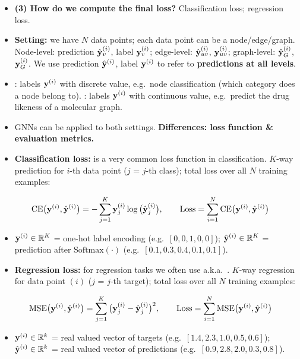\begin{itemize}
  \item \textbf{(3) How do we compute the final loss?} Classification loss;
    regression loss.
  \item \textbf{Setting:} we have $N$ data points; each data point can be a
    node/edge/graph. Node-level: prediction $\hat{\mathbf{y}}_v^{(i)}$, label
    $\mathbf{y}_v^{(i)}$; edge-level: $\hat{\mathbf{y}}_{uv}^{(i)}$, $\mathbf{y}_{uv}^{(i)}$;
    graph-level: $\hat{\mathbf{y}}_G^{(i)}$, $\mathbf{y}_G^{(i)}$. We use prediction
    $\hat{\mathbf{y}}^{(i)}$, label $\mathbf{y}^{(i)}$ to refer to \textbf{predictions at all
    levels}.
  \item {}: labels $\mathbf{y}^{(i)}$ with discrete value, e.g.\ node
    classification (which category does a node belong to).
    : labels $\mathbf{y}^{(i)}$ with continuous value, e.g.\ predict
    the drug likeness of a molecular graph.
  \item GNNs can be applied to both settings. \textbf{Differences: loss
    function \& evaluation metrics.}
  \item \textbf{Classification loss:}  is a very common
    loss function in classification. $K$-way prediction for $i$-th data point
    ($j$ = $j$-th class); total loss over all $N$ training examples:
\end{itemize}
\begin{equation}\label{eq:lec05-ce}
  \mathrm{CE}\big(\mathbf{y}^{(i)},\hat{\mathbf{y}}^{(i)}\big)
  = -\sum_{j=1}^{K}\mathbf{y}_j^{(i)}\log\big(\hat{\mathbf{y}}_j^{(i)}\big),
  \qquad
  \mathrm{Loss} = \sum_{i=1}^{N}\mathrm{CE}\big(\mathbf{y}^{(i)},\hat{\mathbf{y}}^{(i)}\big)
\end{equation}
\begin{itemize}
  \item[] $\mathbf{y}^{(i)}\in\mathbb{R}^K$ = one-hot label encoding (e.g.\ $[0,0,1,0,0]$);
    $\hat{\mathbf{y}}^{(i)}\in\mathbb{R}^K$ = prediction after $\mathrm{Softmax}(\cdot)$
    (e.g.\ $[0.1,0.3,0.4,0.1,0.1]$).
  \item \textbf{Regression loss:} for regression tasks we often use
     a.k.a.\ . $K$-way regression
    for data point $(i)$ ($j$ = $j$-th target); total loss over all $N$
    training examples:
\end{itemize}
\begin{equation}\label{eq:lec05-mse}
  \mathrm{MSE}\big(\mathbf{y}^{(i)},\hat{\mathbf{y}}^{(i)}\big)
  = \sum_{j=1}^{K}\big(\mathbf{y}_j^{(i)}-\hat{\mathbf{y}}_j^{(i)}\big)^2,
  \qquad
  \mathrm{Loss} = \sum_{i=1}^{N}\mathrm{MSE}\big(\mathbf{y}^{(i)},\hat{\mathbf{y}}^{(i)}\big)
\end{equation}
\begin{itemize}
  \item[] $\mathbf{y}^{(i)}\in\mathbb{R}^k$ = real valued vector of targets (e.g.\
    $[1.4,2.3,1.0,0.5,0.6]$); $\hat{\mathbf{y}}^{(i)}\in\mathbb{R}^k$ = real valued vector of
    predictions (e.g.\ $[0.9,2.8,2.0,0.3,0.8]$).
\end{itemize}

